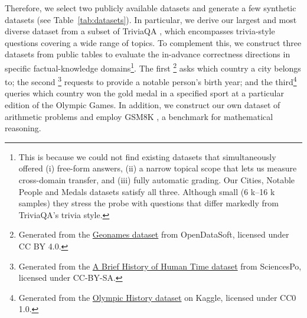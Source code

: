 \documentclass{article} %
\begin{document}

Therefore, we select two publicly available datasets and generate a few synthetic datasets (see Table~\ref{tab:datasets}). In particular, we derive our largest and most diverse dataset from a subset of TriviaQA \citep{TriviaQA}, which encompasses trivia-style questions covering a wide range of topics. To complement this, we construct three datasets from public tables to evaluate the in-advance correctness directions in specific factual-knowledge domains\footnote{This is because we could not find existing datasets that simultaneously offered (i) free-form answers, (ii) a narrow topical scope that lets us measure cross-domain transfer, and (iii) fully automatic grading.  Our Cities, Notable People and Medals datasets satisfy all three. Although small (6 k–16 k samples) they stress the probe with questions that differ markedly from TriviaQA’s trivia style.}.%
The first
\footnote{Generated from the \href{https://public.opendatasoft.com/explore/dataset/geonames-all-cities-with-a-population-1000/}{Geonames dataset} from OpenDataSoft, licensed under CC BY 4.0.} asks which country a city belongs to; the second \footnote{Generated from the \href{https://data.sciencespo.fr/dataset.xhtml?persistentId=doi:10.21410/7E4/RDAG3O}{A Brief History of Human Time dataset} from SciencesPo, licensed under CC-BY-SA.} requests to provide a notable person’s birth year; and the 
third\footnote{Generated from the \href{https://www.kaggle.com/datasets/heesoo37/120-years-of-olympic-history-athletes-and-results}{Olympic History dataset} on Kaggle, licensed under CC0 1.0.} queries which country won the gold medal in a specified sport at a particular edition of the Olympic Games. In addition, we construct our own dataset of arithmetic problems and employ GSM8K \citep{Cobbe2021TrainingVT}, a benchmark for mathematical reasoning.
\end{document}
